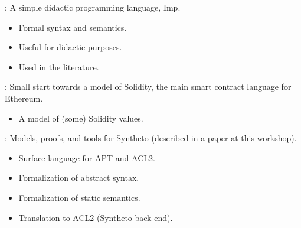 
\begin{frame}

\newlibtitle

:
A simple didactic programming language, Imp.
\begin{itemize}
\item Formal syntax and semantics.
\item Useful for didactic purposes.
\item Used in the literature.
\end{itemize}

\end{frame}


\begin{frame}

\newlibtitle

:
Small start towards a model of Solidity,
the main smart contract language for Ethereum.
\begin{itemize}
\item A model of (some) Solidity values.
\end{itemize}

\end{frame}


\begin{frame}

\newlibtitle

:
Models, proofs, and tools for Syntheto (described in a paper at this workshop).
\begin{itemize}
\item Surface language for APT and ACL2.
\item Formalization of abstract syntax.
\item Formalization of static semantics.
\item Translation to ACL2 (Syntheto back end).
\end{itemize}

\end{frame}


